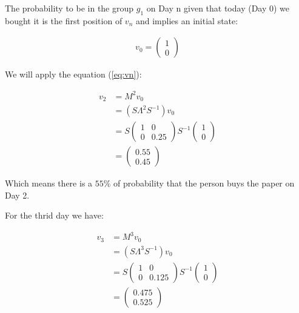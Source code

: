 \documentclass{article}
\begin{document}
The probability to be in the group $g_1$ on Day n given that today (Day 0)
we bought it is the first position of $v_n$ and implies an initial state:

\begin{equation*}
\begin{aligned}
v_0 = 
\left(
\begin{array}{c}
1\\ 
0 
 \end{array}
 \right) 
\end{aligned}
\end{equation*} 

We will apply the equation (\ref{eq:vn}):

\begin{equation}
\begin{aligned}
v_2 &= M^2 v_0 \\ 
	&=(S\Lambda^2 S^{-1}) v_0\\
	     &=  
	S
	\begin{pmatrix}
	1 & 0 \\ 
	0 & 0.25
	\end{pmatrix}
	S^{-1} 
	\left(
	\begin{array}{c}
	1 \\ 
	0 
	 \end{array}
	 \right) \\
	  &=
	  \left(
	  \begin{array}{c}
	  0.55\\ 
	  0.45 
	   \end{array}
	   \right) 
\end{aligned}
\end{equation}

Which means there is a $55\%$ of probability that the person buys the paper on Day 2.

For the thrid day we have:

\begin{equation}
\begin{aligned}
v_3 &= M^3 v_0 \\ 
	&=(S\Lambda^3 S^{-1}) v_0\\
	     &=  
	S
	\begin{pmatrix}
	1 & 0 \\ 
	0 & 0.125
	\end{pmatrix}
	S^{-1} 
	\left(
	\begin{array}{c}
	1 \\ 
	0 
	 \end{array}
	 \right) \\
	  &=
	  \left(
	  \begin{array}{c}
	  0.475\\ 
	  0.525 
	   \end{array}
	   \right) 
\end{aligned}
\end{equation}
\end{document}
